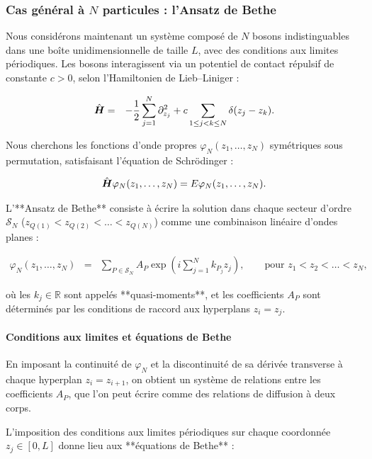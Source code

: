 \subsubsection{Cas général à \(N\) particules : l'Ansatz de Bethe}

Nous considérons maintenant un système composé de \(N\) bosons indistinguables dans une boîte unidimensionnelle de taille \(L\), avec des conditions aux limites périodiques. Les bosons interagissent via un potentiel de contact répulsif de constante \(c > 0\), selon l’Hamiltonien de Lieb–Liniger :

\begin{eqnarray}
	\hat{\bm{H}} & = & -\frac{1}{2} \sum_{j=1}^N \partial_{z_j}^2 + c \sum_{1 \leq j < k \leq N} \delta(z_j - z_k).
\end{eqnarray}

Nous cherchons les fonctions d’onde propres \(\varphi_N(z_1, \dots, z_N)\) symétriques sous permutation, satisfaisant l’équation de Schrödinger :

\begin{eqnarray}
	\hat{\bm{H}} \varphi_N(z_1, \dots, z_N) = E \varphi_N(z_1, \dots, z_N).
\end{eqnarray}

L’**Ansatz de Bethe** consiste à écrire la solution dans chaque secteur d’ordre \(\mathcal{S}_N\) (\(z_{Q(1)} < z_{Q(2)} < \dots < z_{Q(N)}\)) comme une combinaison linéaire d’ondes planes :

\begin{eqnarray}
	\varphi_N(z_1, \dots, z_N) & = & \sum_{P \in \mathcal{S}_N} A_P \exp\left(i \sum_{j=1}^N k_{P_j} z_j \right), \qquad \text{pour } z_1 < z_2 < \dots < z_N,
\end{eqnarray}

où les \(k_j \in \mathbb{R}\) sont appelés **quasi-moments**, et les coefficients \(A_P\) sont déterminés par les conditions de raccord aux hyperplans \(z_i = z_j\).

\paragraph{Conditions aux limites et équations de Bethe}

En imposant la continuité de \(\varphi_N\) et la discontinuité de sa dérivée transverse à chaque hyperplan \(z_i = z_{i+1}\), on obtient un système de relations entre les coefficients \(A_P\), que l’on peut écrire comme des relations de diffusion à deux corps.

L’imposition des conditions aux limites périodiques sur chaque coordonnée \(z_j \in [0, L]\) donne lieu aux **équations de Bethe** :

